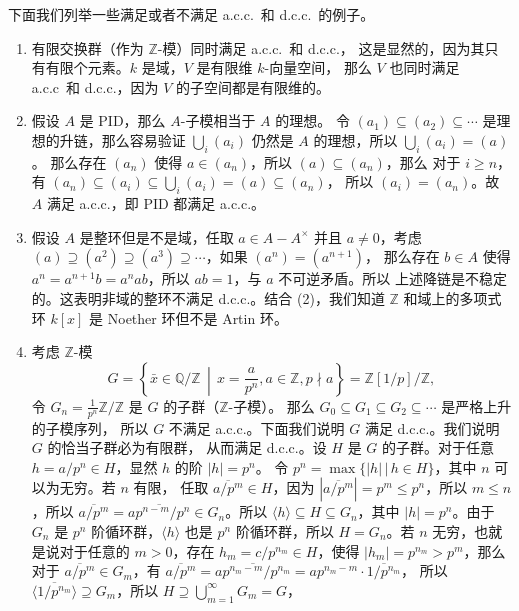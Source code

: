 \begin{example} 下面我们列举一些满足或者不满足 a.c.c.\ 和 d.c.c.\ 的例子。
  \begin{enumerate}
    \item 有限交换群（作为 $\mathbb{Z}$-模）同时满足 a.c.c.\ 和 d.c.c.，
    这是显然的，因为其只有有限个元素。$k$ 是域，$V$ 是有限维 $k$-向量空间，
    那么 $V$ 也同时满足 a.c.c\ 和 d.c.c.，因为 $V$ 的子空间都是有限维的。
    \item 假设 $A$ 是 PID，那么 $A$-子模相当于 $A$ 的理想。 
    令 $(a_1)\subseteq (a_2)\subseteq \cdots$ 是理想的升链，那么容易验证
    $\bigcup_i(a_i)$ 仍然是 $A$ 的理想，所以 $\bigcup_i (a_i)=(a)$。
    那么存在 $(a_n)$ 使得 $a\in (a_n)$，所以 $(a)\subseteq (a_n)$，那么
    对于 $i\geq n$，有 $(a_n)\subseteq (a_i)\subseteq \bigcup_i(a_i)=(a)\subseteq (a_n)$，
    所以 $(a_i)=(a_n)$。故 $A$ 满足 a.c.c.，即 PID 都满足 a.c.c.。
    \item 假设 $A$ 是整环但是不是域，任取 $a\in A- A^\times$ 并且 $a\neq 0$，考虑
    $(a)\supseteq (a^2)\supseteq (a^3)\supseteq \cdots$，如果 $(a^n)=(a^{n+1})$，
    那么存在 $b\in A$ 使得 $a^n=a^{n+1}b=a^nab$，所以 $ab=1$，与 $a$ 不可逆矛盾。所以
    上述降链是不稳定的。这表明非域的整环不满足 d.c.c.。结合 (2)，我们知道
    $\mathbb{Z}$ 和域上的多项式环 $k[x]$ 是 Noether 环但不是 Artin 环。
    \item 考虑 $\mathbb{Z}$-模
    \[
      G=\left\{\bar x\in\mathbb{Q}/\mathbb{Z}\,\middle\vert\, x=\frac{a}{p^n}
      ,a\in\mathbb{Z},p\nmid a\right\}=\mathbb{Z}[1/p]/\mathbb{Z},
    \]
    令 $G_n=\frac{1}{p^n}\mathbb{Z}/\mathbb{Z}$ 是 $G$ 的子群（$\mathbb{Z}$-子模）。
    那么 $G_0\subseteq G_1\subseteq G_2\subseteq \cdots$ 是严格上升的子模序列，
    所以 $G$ 不满足 a.c.c.。下面我们说明 $G$ 满足 d.c.c.。我们说明 $G$ 的恰当子群必为有限群，
    从而满足 d.c.c.。设 $H$ 是 $G$ 的子群。对于任意 $h=a/p^n\in H$，显然 $h$ 的阶 $|h|=p^n$。
    令 $p^n=\max\{|h|\,|\, h\in H\}$，其中 $n$ 可以为无穷。若 $n$ 有限，
    任取 $\overline{a/p^m}\in H$，因为 $|\overline{a/p^m}|=p^m\leq p^n$，所以
    $m\leq n$，所以 $\overline{a/p^m}=\overline{ap^{n-m}/p^n}\in G_n$。所以 $\langle h\rangle\subseteq H\subseteq G_n$，其中 $|h|=p^n$。由于 $G_n$ 是 $p^n$ 阶循环群，$\langle h\rangle$ 也是 $p^n$
    阶循环群，所以 $H=G_n$。若 $n$ 无穷，也就是说对于任意的 $m>0$，存在 $h_m=c/p^{n_m}\in H$，使得
    $|h_m|=p^{n_m}>p^m$，那么对于 $\overline{a/p^m}\in G_m$，有 
    $\overline{a/p^m}=\overline{ap^{n_m-m}/p^{n_m}}=ap^{n_m-m}\cdot \overline{1/p^{n_m}}$，
    所以 $\langle \overline{1/p^{n_m}}\rangle\supseteq G_m$，所以 $H\supseteq \bigcup_{m=1}^{\infty} G_m=G$，

\end{enumerate}
\end{example}
